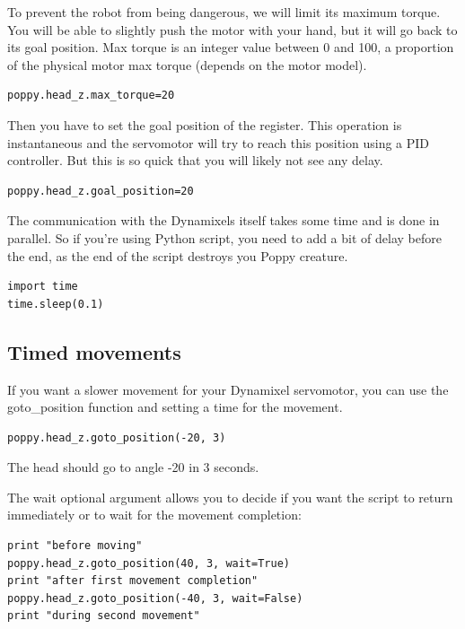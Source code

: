 \documentclass{article}
\begin{document}
To prevent the robot from being dangerous, we will limit its maximum torque. You will be able to slightly push the motor with your hand, but it will go back to its goal position. Max torque is an integer value between 0 and 100, a proportion of the physical motor max torque (depends on the motor model).

\begin{verbatim}
poppy.head_z.max_torque=20
\end{verbatim}

Then you have to set the goal position of the register. This operation is instantaneous and the servomotor will try to reach this position using a PID controller. But this is so quick that you will likely not see any delay.

\begin{verbatim}
poppy.head_z.goal_position=20
\end{verbatim}

 The communication with the Dynamixels itself takes some time and is done in parallel. So if you're using Python script, you need to add a bit of delay before the end, as the end of the script destroys you Poppy creature.
 
 \begin{verbatim}
import time
time.sleep(0.1)
\end{verbatim}

\subsection{Timed movements}

If you want a slower movement for your Dynamixel servomotor, you can use the goto\_position function and setting a time for the movement. 

\begin{verbatim}
poppy.head_z.goto_position(-20, 3)
\end{verbatim}

The head should go to angle -20 in 3 seconds.

The wait optional argument allows you to decide if you want the script to return immediately or to wait for the movement completion:

\begin{verbatim}
print "before moving"
poppy.head_z.goto_position(40, 3, wait=True)
print "after first movement completion"
poppy.head_z.goto_position(-40, 3, wait=False)
print "during second movement"
\end{verbatim}
\end{document}
